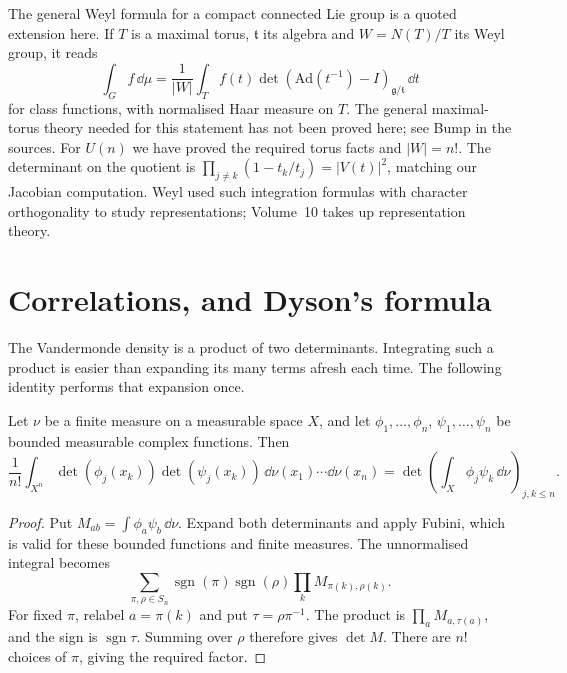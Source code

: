 \begin{remark}
The general Weyl formula for a compact connected Lie group is a quoted
extension here. If $T$ is a maximal torus, $\mathfrak t$ its algebra and
$W=N(T)/T$ its Weyl group, it reads
\[
 \int_G f\,\dd\mu=\frac1{|W|}\int_T f(t)
 \det(\mathrm{Ad}(t^{-1})-I)_{\mathfrak g/\mathfrak t}\,\dd t
\]
for class functions, with normalised Haar measure on $T$.
The general maximal-torus theory needed for this statement has not been
proved here; see Bump in the sources.
For $U(n)$ we have proved the required torus facts and $|W|=n!$.
The determinant on the quotient is $\prod_{j\ne k}(1-t_k/t_j)=|V(t)|^2$,
matching our Jacobian computation. Weyl used such integration formulas
with character orthogonality to study representations; Volume~10 takes
up representation theory.
\end{remark}

\section{Correlations, and Dyson's formula}

The Vandermonde density is a product of two determinants.
Integrating such a product is easier than expanding its many terms afresh
each time. The following identity performs that expansion once.

\begin{lemma}\label{lem:andreief}
Let $\nu$ be a finite measure on a measurable space $X$, and let
$\phi_1,\ldots,\phi_n$, $\psi_1,\ldots,\psi_n$ be bounded measurable
complex functions. Then
\[
 \frac1{n!}\int_{X^n}\det(\phi_j(x_k))\det(\psi_j(x_k))
       \,\dd\nu(x_1)\cdots\dd\nu(x_n)
 =\det\left(\int_X\phi_j\psi_k\,\dd\nu\right)_{j,k\le n}.
\]
\end{lemma}
\begin{proof}
Put $M_{ab}=\int\phi_a\psi_b\,\dd\nu$.
Expand both determinants and apply Fubini, which is valid for these
bounded functions and finite measures. The unnormalised integral becomes
\[
 \sum_{\pi,\rho\in S_n}\operatorname{sgn}(\pi)\operatorname{sgn}(\rho)
 \prod_k M_{\pi(k),\rho(k)}.
\]
For fixed $\pi$, relabel $a=\pi(k)$ and put $\tau=\rho\pi^{-1}$.
The product is $\prod_aM_{a,\tau(a)}$, and the sign is
$\operatorname{sgn}\tau$. Summing over $\rho$ therefore gives
$\det M$. There are $n!$ choices of $\pi$, giving the required factor.
\end{proof}

